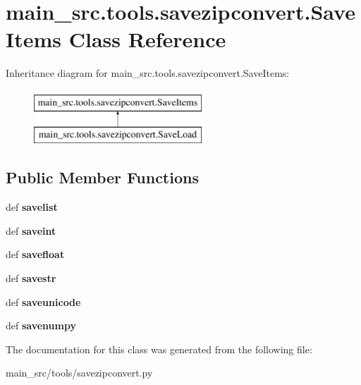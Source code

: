 \hypertarget{classmain__src_1_1tools_1_1savezipconvert_1_1SaveItems}{\section{main\-\_\-src.\-tools.\-savezipconvert.\-Save\-Items Class Reference}
\label{classmain__src_1_1tools_1_1savezipconvert_1_1SaveItems}
}
Inheritance diagram for main\-\_\-src.\-tools.\-savezipconvert.\-Save\-Items\-:\begin{figure}[H]
\begin{center}
\leavevmode
\includegraphics[height=2.000000cm]{classmain__src_1_1tools_1_1savezipconvert_1_1SaveItems}
\end{center}
\end{figure}
\subsection*{Public Member Functions}
\begin{DoxyCompactItemize}
\item 
\hypertarget{classmain__src_1_1tools_1_1savezipconvert_1_1SaveItems_a28bf3c8483a27df979963b6351b643ec}{def {\bfseries savelist}}\label{classmain__src_1_1tools_1_1savezipconvert_1_1SaveItems_a28bf3c8483a27df979963b6351b643ec}

\item 
\hypertarget{classmain__src_1_1tools_1_1savezipconvert_1_1SaveItems_a1ca82b544b46716c7115301538e0d206}{def {\bfseries saveint}}\label{classmain__src_1_1tools_1_1savezipconvert_1_1SaveItems_a1ca82b544b46716c7115301538e0d206}

\item 
\hypertarget{classmain__src_1_1tools_1_1savezipconvert_1_1SaveItems_ab05fcdd036a981e601ee029765f5cf3f}{def {\bfseries savefloat}}\label{classmain__src_1_1tools_1_1savezipconvert_1_1SaveItems_ab05fcdd036a981e601ee029765f5cf3f}

\item 
\hypertarget{classmain__src_1_1tools_1_1savezipconvert_1_1SaveItems_aa4acc17bbc5885af2c9cb409d6f41e5f}{def {\bfseries savestr}}\label{classmain__src_1_1tools_1_1savezipconvert_1_1SaveItems_aa4acc17bbc5885af2c9cb409d6f41e5f}

\item 
\hypertarget{classmain__src_1_1tools_1_1savezipconvert_1_1SaveItems_a89a7ed31b26178638f4034beb5fd9e43}{def {\bfseries saveunicode}}\label{classmain__src_1_1tools_1_1savezipconvert_1_1SaveItems_a89a7ed31b26178638f4034beb5fd9e43}

\item 
\hypertarget{classmain__src_1_1tools_1_1savezipconvert_1_1SaveItems_af712358fe2c36561145f43de1b831219}{def {\bfseries savenumpy}}\label{classmain__src_1_1tools_1_1savezipconvert_1_1SaveItems_af712358fe2c36561145f43de1b831219}

\end{DoxyCompactItemize}


The documentation for this class was generated from the following file\-:\begin{DoxyCompactItemize}
\item 
main\-\_\-src/tools/savezipconvert.\-py\end{DoxyCompactItemize}

